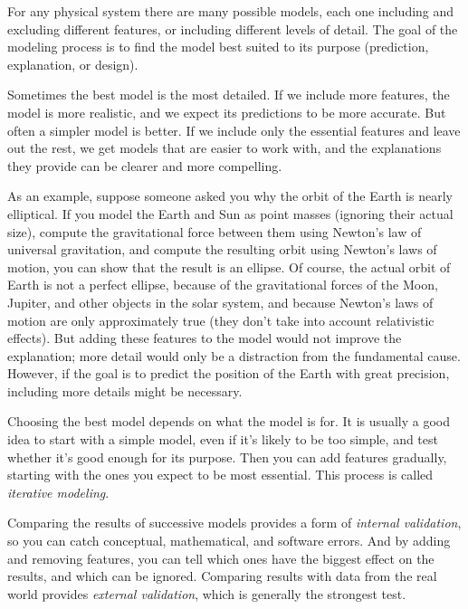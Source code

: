
For any physical system there are many possible models, each one including and excluding different features, or including different levels of detail.  The goal of the modeling process is to find the model best suited to its purpose (prediction, explanation, or design).


Sometimes the best model is the most detailed.  If we include more features, the model is more realistic, and we expect its predictions to be more accurate.  
But often a simpler model is better.  If we include only the essential features and leave out the rest, we get models that are easier to work with, and the explanations they provide can be clearer and more compelling. 

As an example, suppose someone asked you why the orbit of the Earth is nearly elliptical.  If you model the Earth and Sun as point masses (ignoring their actual size), compute the gravitational force between them using Newton's law of universal gravitation, and compute the resulting orbit using Newton's laws of motion, you can show that the result is an ellipse.
Of course, the actual orbit of Earth is not a perfect ellipse, because of the gravitational forces of the Moon, Jupiter, and other objects in the solar system, and because Newton's laws of motion are only approximately true (they don't take into account relativistic effects).
%
%
But adding these features to the model would not improve the explanation; more detail would only be a distraction from the fundamental cause.  However, if the goal is to predict the position of the Earth with great precision, including more details might be necessary.  

Choosing the best model depends on what the model is for.  It is usually a good idea to start with a simple model, even if it's likely to be too simple, and test whether it's good enough for its purpose.  Then you can add features gradually, starting with the ones you expect to be most essential.  This process is called \emph{iterative modeling}.


Comparing the results of successive models provides a form of \emph{internal validation}, so you can catch conceptual, mathematical, and software errors.  And by adding and removing features, you can tell which ones have the biggest effect on the results, and which can be ignored.
%
%
%
%
Comparing results with data from the real world provides \emph{external validation}, which is generally the strongest test.

